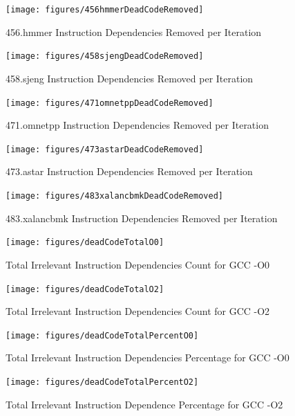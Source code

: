 \documentclass[defaultstyle,11pt]{thesis}
\begin{document}
\begin{figure}
  \centering
  \texttt{[image: figures/456hmmerDeadCodeRemoved]}
  \caption{456.hmmer Instruction Dependencies Removed per Iteration}
  \label{fig:456hmmerdc}
\end{figure}

\begin{figure}
  \centering
  \texttt{[image: figures/458sjengDeadCodeRemoved]}
  \caption{458.sjeng Instruction Dependencies Removed per Iteration}
  \label{fig:458sjengdc}
\end{figure}

\begin{figure}
  \centering
  \texttt{[image: figures/471omnetppDeadCodeRemoved]}
  \caption{471.omnetpp Instruction Dependencies Removed per Iteration}
  \label{fig:471omnetppdc}
\end{figure}

\begin{figure}
  \centering
  \texttt{[image: figures/473astarDeadCodeRemoved]}
  \caption{473.astar Instruction Dependencies Removed per Iteration}
  \label{fig:473astardc}
\end{figure}

\begin{figure}
  \centering
  \texttt{[image: figures/483xalancbmkDeadCodeRemoved]}
  \caption{483.xalancbmk Instruction Dependencies Removed per Iteration}
  \label{fig:483xalancbmkdc}
\end{figure}

\begin{figure}
  \centering
  \texttt{[image: figures/deadCodeTotalO0]}
  \caption{Total Irrelevant Instruction Dependencies Count for GCC -O0}
  \label{fig:totalDeadO0}
\end{figure}

\begin{figure}
  \centering
  \texttt{[image: figures/deadCodeTotalO2]}
  \caption{Total Irrelevant Instruction Dependencies Count for GCC -O2}
  \label{fig:totalDeadO2}
\end{figure}

\begin{figure}
  \centering
  \texttt{[image: figures/deadCodeTotalPercentO0]}
  \caption{Total Irrelevant Instruction Dependencies Percentage for GCC -O0}
  \label{fig:totalDeadPercentO2}
\end{figure}

\begin{figure}
  \centering
  \texttt{[image: figures/deadCodeTotalPercentO2]}
  \caption{Total Irrelevant Instruction Dependence Percentage for GCC -O2}
  \label{fig:totalDeadPercentO0}
\end{figure}
\end{document}
